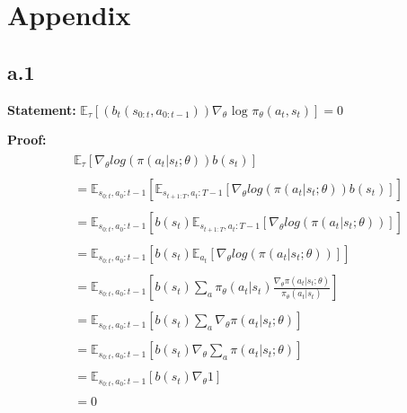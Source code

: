 \section{Appendix}
\label{appendix}

\subsection*{a.1}
\label{a.1}
\textbf{Statement:} $\mathbb{E}_{\tau}[(b_t(s_{0:t}, a_{0:t-1})) \nabla_{\theta} \text{ log } \pi_{\theta}(a_t, s_t)]=0$

\textbf{Proof:}
\begin{align*}
\begin{split}
&\mathbb{E}_{\tau}[\nabla_{\theta} log(\pi(a_{t}|s_{t};\theta))b(s_{t})] \\ \\
&=\mathbb{E}_{s_{0:t},a_{0}:t-1}[\mathbb{E}_{s_{t+1:T},a_{t}:T-1}[\nabla_{\theta} log(\pi(a_{t}|s_{t};\theta))b(s_{t})]] \\ \\
&=\mathbb{E}_{s_{0:t},a_{0}:t-1}[b(s_{t})\mathbb{E}_{s_{t+1:T},a_{t}:T-1}[\nabla_{\theta} log(\pi(a_{t}|s_{t};\theta))]] \\ \\
&=\mathbb{E}_{s_{0:t},a_{0}:t-1}[b(s_{t})\mathbb{E}_{a_{t}}[\nabla_{\theta} log(\pi(a_{t}|s_{t};\theta))]] \\ \\
&=\mathbb{E}_{s_{0:t},a_{0}:t-1}[b(s_{t}) \sum_{a} \pi_{\theta}(a_{t}|s_{t})\frac{\nabla_{\theta}\pi(a_{t}|s_{t};\theta)}{\pi_{\theta}(a_{t}|s_{t})}] \\ \\
&=\mathbb{E}_{s_{0:t},a_{0}:t-1}[b(s_{t}) \sum_{a} \nabla_{\theta}\pi(a_{t}|s_{t};\theta)] \\ \\
&=\mathbb{E}_{s_{0:t},a_{0}:t-1}[b(s_{t}) \nabla_{\theta}\sum_{a} \pi(a_{t}|s_{t};\theta)] \\ \\
&=\mathbb{E}_{s_{0:t},a_{0}:t-1}[b(s_{t}) \nabla_{\theta}1] \\ \\
&=0
\end{split}
\end{align*}
